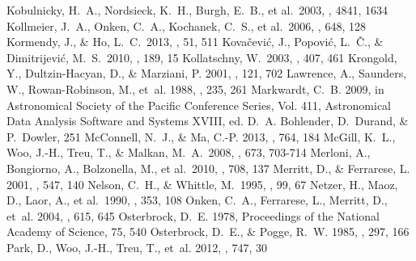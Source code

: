 \documentclass[iop]{emulateapj}
\begin{document}
\begin{thebibliography}{63}
 Kobulnicky, H.~A., Nordsieck, K.~H., Burgh, E.~B., et al.\ 2003, \procspie, 4841, 1634  
 Kollmeier, J.~A., 
Onken, C.~A., Kochanek, C.~S., et al.\ 2006, \apj, 648, 128 
Kormendy, J., \& Ho, L.~C.\ 2013, \araa, 51, 511
 Kova{\v 
c}evi{\'c}, J., Popovi{\'c}, L.~{\v C}., 
\& Dimitrijevi{\'c}, M.~S.\ 2010, \apjs, 189, 15  
 Kollatschny, W.\ 2003, \aap, 407, 461 
{Krongold}, Y., {Dultzin-Hacyan}, D., \& {Marziani}, P. 2001, \aj, 121, 702
{Lawrence}, A., {Saunders}, W., {Rowan-Robinson}, M., {et~al.} 1988, \mnras,
  235, 261
{Markwardt}, C.~B. 2009, in Astronomical Society of the Pacific Conference
  Series, Vol. 411, Astronomical Data Analysis Software and Systems XVIII, ed.
  D.~A. {Bohlender}, D.~{Durand}, \& P.~{Dowler}, 251
{McConnell}, N.~J., \& {Ma}, C.-P. 2013, \apj, 764, 184
 McGill, K.~L., Woo, J.-H., Treu, T., \& Malkan, M.~A.\ 2008, \apj, 673, 703-714 
 Merloni, A., Bongiorno, 
A., Bolzonella, M., et al.\ 2010, \apj, 708, 137 
{Merritt}, D., \& {Ferrarese}, L. 2001, \apj, 547, 140
 Nelson, C.~H., \& Whittle, M.\ 1995, \apjs, 99, 67 
 Netzer, H., Maoz, D., 
Laor, A., et al.\ 1990, \apj, 353, 108 
{Onken}, C.~A., {Ferrarese}, L., {Merritt}, D., {et~al.} 2004, \apj, 615, 645
{Osterbrock}, D.~E. 1978, Proceedings of the National Academy of Science, 75,  540
{Osterbrock}, D.~E., \& {Pogge}, R.~W. 1985, \apj, 297, 166
{Park}, D., {Woo}, J.-H., {Treu}, T., {et~al.} 2012, \apj, 747, 30


\end{thebibliography}
\end{document}
